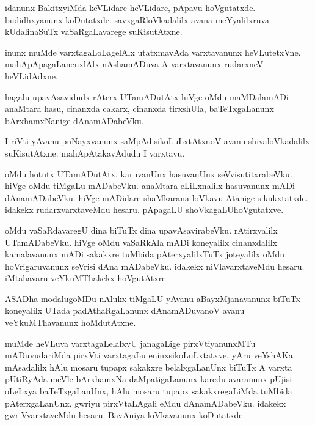 \documentclass{article}
\begin{document}
\begin{mn}
idanunx  BakitxyiMda  keVLidare  heVLidare,  pApavu  hoVgutatxde.  budidhxyanunx  koDutatxde.  
savxgaRloVkadalilx  avana  meYyalilxruva  kUdalinaSuTx  vaSaRgaLavarege  suKisutAtxne.
\end{mn}

\begin{mn}
inunx  muMde  varxtagaLoLagelAlx  utatxmavAda  varxtavanunx  heVLutetxVne.  
mahApApagaLanenxlAlx  nAshamADuva  A  varxtavanunx  rudarxneV  heVLidAdxne.
\end{mn}

\begin{mn}
hagalu  upavAsavidudx  rAterx  UTamADutAtx  hiVge  oMdu  maMDalamADi  anaMtara  hasu,  
cinanxda  cakarx,  cinanxda  tirxshUla,  baTeTxgaLanunx  bArxhamxNanige  dAnamADabeVku.
\end{mn}

\begin{mn}
I riVti  yAvanu  puNayxvanunx  saMpAdisikoLuLxtAtxnoV  avanu  shivaloVkadalilx  
suKisutAtxne.  mahApAtakavAdudu  I varxtavu.
\end{mn}

\begin{mn}
oMdu  hotutx  UTamADutAtx,  karuvanUnx  hasuvanUnx  seVvisutitxrabeVku.  hiVge  
oMdu  tiMgaLu  mADabeVku.  anaMtara  eLiLxnalilx  hasuvanunx  mADi dAnamADabeVku.  
hiVge  mADidare  shaMkarana  loVkavu  Atanige  sikukxtatxde.  idakekx  
rudarxvarxtaveMdu  hesaru.  pApagaLU  shoVkagaLUhoVgutatxve.
\end{mn}

\begin{mn}
oMdu  vaSaRdavaregU  dina  biTuTx  dina  upavAsavirabeVku.  rAtirxyalilx  UTamADabeVku.  
hiVge  oMdu  vaSaRkAla  mADi  koneyalilx  cinanxdalilx  kamalavanunx  mADi  sakakxre  
tuMbida  pAterxyalilxTuTx  joteyalilx  oMdu  hoVrigaruvanunx  seVrisi  dAna mADabeVku.  
idakekx  niVlavarxtaveMdu  hesaru.  iMtahavaru  veYkuMThakekx hoVgutAtxre.
\end{mn}

\begin{mn}
ASADha  modalugoMDu  nAlukx tiMgaLU  yAvanu  aBayxMjanavanunx  biTuTx  koneyalilx  
UTada  padAthaRgaLanunx  dAnamADuvanoV  avanu  veYkuMThavanunx  hoMdutAtxne.
\end{mn}

\begin{mn}
muMde  heVLuva  varxtagaLelalxvU  janagaLige  pirxVtiyanunxMTu  mADuvudariMda  pirxVti  
varxtagaLu  eninxsikoLuLxtatxve.  yAru  veYshAKa  mAsadalilx  hAlu  mosaru  tupapx  
sakakxre  belalxgaLanUnx  biTuTx  A  varxta  pUtiRyAda  meVle  bArxhamxNa daMpatigaLanunx  
karedu  avaranunx  pUjisi  oLeLxya  baTeTxgaLanUnx,  hAlu  mosaru  tupapx  sakakxregaLiMda  
tuMbida  pAterxgaLanUnx,  gwriyu  pirxVtaLAgali  eMdu  dAnamADabeVku.  idakekx  
gwriVvarxtaveMdu  hesaru.  BavAniya  loVkavanunx  koDutatxde. 
\end{mn}
\end{document}
